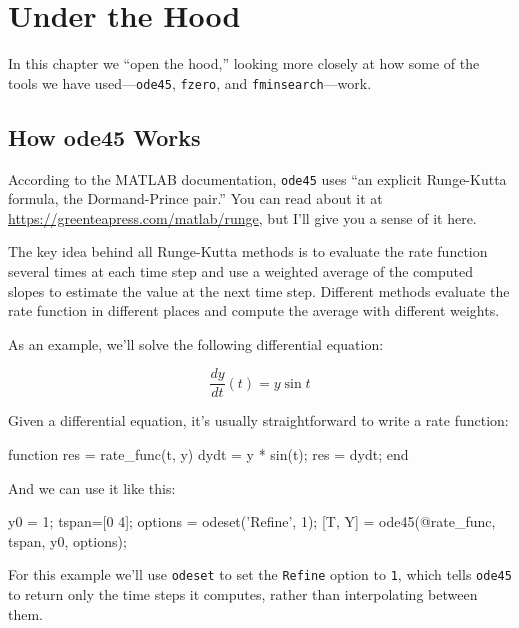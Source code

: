 \chapter{Under the Hood}
\label{how}


In this chapter we ``open the hood,'' looking more closely at how some of the tools we have used---\lstinline{ode45}, \lstinline{fzero}, and \lstinline{fminsearch}---work.


\section{How ode45 Works}
\label{howode45}

According to the MATLAB documentation, \lstinline{ode45} uses ``an explicit Runge-Kutta formula, the Dormand-Prince pair.''  You can read about it at \linebreak \url{https://greenteapress.com/matlab/runge}, but I'll give you a sense of it here.


The key idea behind all Runge-Kutta methods is to evaluate the rate function several times at each time step and use a weighted average of the computed slopes to estimate the value at the next time step.
Different methods evaluate the rate function in different places and compute the average with different weights.


As an example, we'll solve the following differential equation:

\[ \frac{dy}{dt}(t) = y \sin t \]

Given a differential equation, it's usually straightforward to write a rate function:

\begin{code}
function res = rate_func(t, y)
    dydt = y * sin(t);
    res = dydt;
end
\end{code}

And we can use it like this:

\begin{code}
    y0 = 1;
    tspan=[0 4];
    options = odeset('Refine', 1);
    [T, Y] = ode45(@rate_func, tspan, y0, options);
\end{code}

For this example we'll use \lstinline{odeset} to set the \lstinline{Refine} option to \lstinline{1}, which tells \lstinline{ode45} to return only the time steps it computes, rather than interpolating between them.

